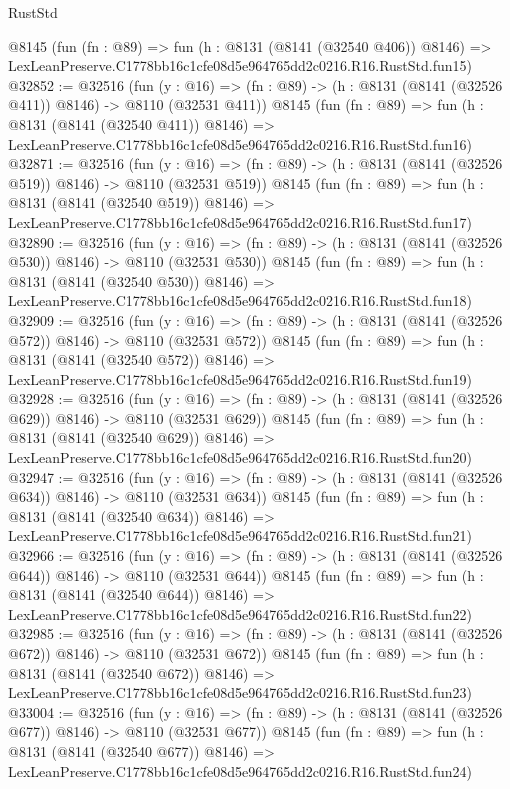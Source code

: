 \begin{lexlean}{RustStd}
\begin{coremodule}
    @8145
    (fun (fn : @89) =>
    fun (h : @8131 (@8141 (@32540 @406)) @8146) =>
    LexLeanPreserve.C1778bb16c1cfe08d5e964765dd2c0216.R16.RustStd.fun15)
@32852 := @32516
    (fun (y : @16) => (fn : @89) -> (h : @8131 (@8141 (@32526 @411)) @8146) -> @8110 (@32531 @411))
    @8145
    (fun (fn : @89) =>
    fun (h : @8131 (@8141 (@32540 @411)) @8146) =>
    LexLeanPreserve.C1778bb16c1cfe08d5e964765dd2c0216.R16.RustStd.fun16)
@32871 := @32516
    (fun (y : @16) => (fn : @89) -> (h : @8131 (@8141 (@32526 @519)) @8146) -> @8110 (@32531 @519))
    @8145
    (fun (fn : @89) =>
    fun (h : @8131 (@8141 (@32540 @519)) @8146) =>
    LexLeanPreserve.C1778bb16c1cfe08d5e964765dd2c0216.R16.RustStd.fun17)
@32890 := @32516
    (fun (y : @16) => (fn : @89) -> (h : @8131 (@8141 (@32526 @530)) @8146) -> @8110 (@32531 @530))
    @8145
    (fun (fn : @89) =>
    fun (h : @8131 (@8141 (@32540 @530)) @8146) =>
    LexLeanPreserve.C1778bb16c1cfe08d5e964765dd2c0216.R16.RustStd.fun18)
@32909 := @32516
    (fun (y : @16) => (fn : @89) -> (h : @8131 (@8141 (@32526 @572)) @8146) -> @8110 (@32531 @572))
    @8145
    (fun (fn : @89) =>
    fun (h : @8131 (@8141 (@32540 @572)) @8146) =>
    LexLeanPreserve.C1778bb16c1cfe08d5e964765dd2c0216.R16.RustStd.fun19)
@32928 := @32516
    (fun (y : @16) => (fn : @89) -> (h : @8131 (@8141 (@32526 @629)) @8146) -> @8110 (@32531 @629))
    @8145
    (fun (fn : @89) =>
    fun (h : @8131 (@8141 (@32540 @629)) @8146) =>
    LexLeanPreserve.C1778bb16c1cfe08d5e964765dd2c0216.R16.RustStd.fun20)
@32947 := @32516
    (fun (y : @16) => (fn : @89) -> (h : @8131 (@8141 (@32526 @634)) @8146) -> @8110 (@32531 @634))
    @8145
    (fun (fn : @89) =>
    fun (h : @8131 (@8141 (@32540 @634)) @8146) =>
    LexLeanPreserve.C1778bb16c1cfe08d5e964765dd2c0216.R16.RustStd.fun21)
@32966 := @32516
    (fun (y : @16) => (fn : @89) -> (h : @8131 (@8141 (@32526 @644)) @8146) -> @8110 (@32531 @644))
    @8145
    (fun (fn : @89) =>
    fun (h : @8131 (@8141 (@32540 @644)) @8146) =>
    LexLeanPreserve.C1778bb16c1cfe08d5e964765dd2c0216.R16.RustStd.fun22)
@32985 := @32516
    (fun (y : @16) => (fn : @89) -> (h : @8131 (@8141 (@32526 @672)) @8146) -> @8110 (@32531 @672))
    @8145
    (fun (fn : @89) =>
    fun (h : @8131 (@8141 (@32540 @672)) @8146) =>
    LexLeanPreserve.C1778bb16c1cfe08d5e964765dd2c0216.R16.RustStd.fun23)
@33004 := @32516
    (fun (y : @16) => (fn : @89) -> (h : @8131 (@8141 (@32526 @677)) @8146) -> @8110 (@32531 @677))
    @8145
    (fun (fn : @89) =>
    fun (h : @8131 (@8141 (@32540 @677)) @8146) =>
    LexLeanPreserve.C1778bb16c1cfe08d5e964765dd2c0216.R16.RustStd.fun24)

\end{coremodule}
\end{lexlean}
